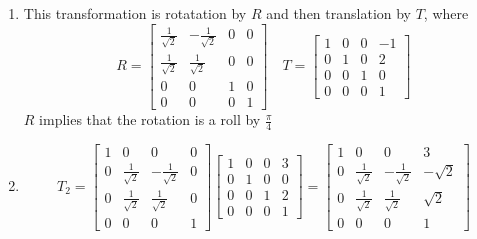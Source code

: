 \documentclass[11pt]{article}
\begin{document}
\begin{solution}

\begin{enumerate}[1.]
    \item 
        This transformation is rotatation by $R$ and then translation by $T$, where\\
        \[
            R =
            \begin{bmatrix}
                \frac{1}{\sqrt{2}} & -\frac{1}{\sqrt{2}} & 0 & 0\\
                \frac{1}{\sqrt{2}} & \frac{1}{\sqrt{2}} & 0 & 0\\
                0 & 0 & 1 & 0\\
                0 & 0 & 0 & 1
            \end{bmatrix}
            \quad
            T = 
            \begin{bmatrix}
                1 & 0 & 0 & -1\\
                0 & 1 & 0 & 2\\
                0 & 0 & 1 & 0\\
                0 & 0 & 0 & 1
            \end{bmatrix}
        \]
        $R$ implies that the rotation is a roll by $\frac{\pi}{4}$
    \item
        \[
            T_2 =
            \begin{bmatrix}
                1 & 0 & 0 & 0\\
                0 & \frac{1}{\sqrt{2}} & -\frac{1}{\sqrt{2}} & 0\\
                0 & \frac{1}{\sqrt{2}} & \frac{1}{\sqrt{2}} & 0\\
                0 & 0 & 0 & 1
            \end{bmatrix}
            \begin{bmatrix}
                1 & 0 & 0 & 3\\
                0 & 1 & 0 & 0\\
                0 & 0 & 1 & 2\\
                0 & 0 & 0 & 1
            \end{bmatrix}
            =
            \begin{bmatrix}
                1 & 0 & 0 & 3\\
                0 & \frac{1}{\sqrt{2}} & -\frac{1}{\sqrt{2}} & -\sqrt{2}\\
                0 & \frac{1}{\sqrt{2}} & \frac{1}{\sqrt{2}} & \sqrt{2}\\
                0 & 0 & 0 & 1

\end{bmatrix}\]
\end{enumerate}
\end{solution}
\end{document}
